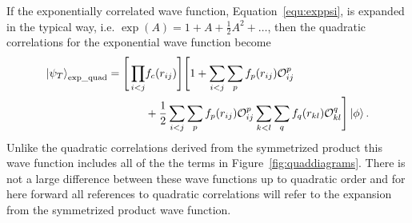 If the exponentially correlated wave function, Equation~\ref{equ:exppsi}, is expanded in the typical way, i.e. $\exp(A) = 1 + A + \frac{1}{2}A^2 + \ldots$, then the quadratic correlations for the exponential wave function become
\begin{equation}
   \begin{split}
      \left| \psi_T \right>_\text{exp\_quad} = \Bigg[\prod\limits_{i<j}&f_c(r_{ij})\Bigg] \Bigg[1+\sum\limits_{i<j}\sum\limits_p f_p(r_{ij})\mathcal{O}_{ij}^p \\
         & + \frac{1}{2}\sum\limits_{i<j}\sum\limits_p f_p(r_{ij})\mathcal{O}_{ij}^p\sum_{\substack{k<l}}\sum\limits_q f_q(r_{kl})\mathcal{O}_{kl}^q \Bigg] \left| \phi \right>.
   \end{split}
   \label{equ:expquadcorr}
\end{equation}
Unlike the quadratic correlations derived from the symmetrized product this wave function includes all of the the terms in Figure~\ref{fig:quaddiagrams}. There is not a large difference between these wave functions up to quadratic order and for here forward all references to quadratic correlations will refer to the expansion from the symmetrized product wave function.

